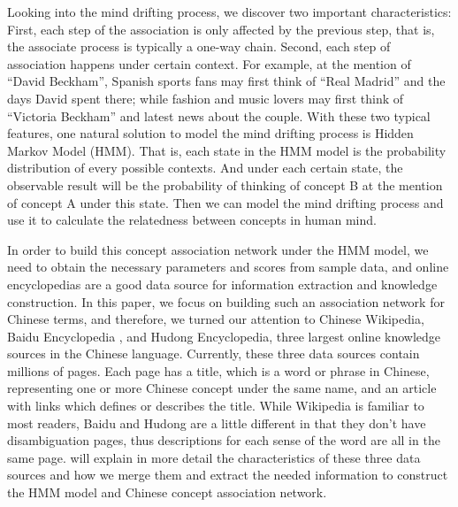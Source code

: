 Looking into the mind drifting process,
we discover two important characteristics:
First, each step of the association is only affected by
the previous step, that is, the associate process is typically
a one-way chain. Second, each step of association happens under
certain context.
For example, at the mention of ``David Beckham'', Spanish sports fans
may first think of ``Real Madrid'' and the days David spent there;
while fashion and music lovers may first think of ``Victoria Beckham''
and latest news about the couple. With these two typical features,
one natural solution to model the mind drifting process is Hidden
Markov Model (HMM). That is, each state in the HMM model is the
probability distribution of every possible contexts.
And under each certain state, the observable result will be the probability of thinking of concept B at the mention of concept A under this state.
Then we can model the mind drifting process and use it to calculate the relatedness between concepts in human mind.

In order to build this concept association network under the HMM model,
we need to obtain the necessary parameters and scores from sample data,
and online encyclopedias are a good data source for information extraction
and knowledge construction. In this paper, we focus on building such an
association network for Chinese terms, and therefore, we turned our attention
to Chinese Wikipedia\cite{wikipedia}, Baidu Encyclopedia \cite{baidu-baike},
and Hudong Encyclopedia\cite{hudong-baike}, three largest online knowledge
sources in the Chinese language.
Currently, these three data sources contain millions of pages.
Each page has a title, which is a word or phrase in Chinese,
representing one or more Chinese concept under the same name,
and an article with links which defines or describes the title.
While Wikipedia is familiar to most readers,
Baidu and Hudong are a little different in that they don't
have disambiguation pages, thus descriptions for each sense of the word
are all in the same page.  will explain in more
detail the characteristics of these three data sources and how we
merge them and extract the needed information to
construct the HMM model and Chinese concept association network.


